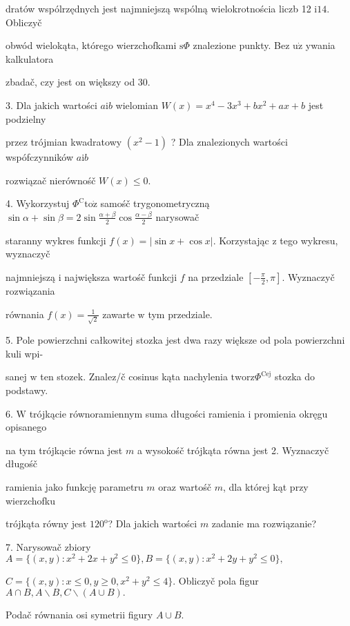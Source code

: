 \documentclass[a4paper,12pt]{article}
\begin{document}
dratów wspólrzędnych jest najmniejszą wspólną wielokrotnościa liczb 12 $\mathrm{i} 14$. Obliczyč

obwód wielokąta, którego wierzchofkami $\mathrm{s}\Phi$ znalezione punkty. Bez $\mathrm{u}\dot{\mathrm{z}}$ ywania kalkulatora

zbadač, czy jest on większy od 30.

3. Dla jakich wartości $a \mathrm{i} b$ wielomian $W(x) = x^{4}-3x^{3}+bx^{2}+ax+b$ jest podzielny

przez trójmian kwadratowy $(x^{2}-1)$ ? Dla znalezionych wartości wspófczynników $a\mathrm{i}b$

rozwiązač nierównośč $W(x)\leq 0.$

4. Wykorzystuj $\Phi^{\mathrm{C}}\mathrm{t}\mathrm{o}\dot{\mathrm{z}}$ samośč trygonometryczną $\displaystyle \sin\alpha+\sin\beta=2\sin\frac{\alpha+\beta}{2}\cos\frac{\alpha-\beta}{2}$ narysowač

staranny wykres funkcji $f(x)=|\sin x+\cos x|$. Korzystając $\mathrm{z}$ tego wykresu, wyznaczyč

najmniejszą $\mathrm{i}$ największa wartośč funkcji $f$ na przedziale $[-\displaystyle \frac{\pi}{2},\pi]$. Wyznaczyč rozwiązania

równania $f(x)=\displaystyle \frac{1}{\sqrt{2}}$ zawarte $\mathrm{w}$ tym przedziale.

5. Pole powierzchni całkowitej stozka jest dwa razy większe od pola powierzchni kuli wpi-

sanej $\mathrm{w}$ ten stozek. Znalez/č cosinus kąta nachylenia $\mathrm{t}\mathrm{w}\mathrm{o}\mathrm{r}\mathrm{z}\Phi^{\mathrm{C}\mathrm{e}\mathrm{j}}$ stozka do podstawy.

6. $\mathrm{W}$ trójkącie równoramiennym suma długości ramienia $\mathrm{i}$ promienia okręgu opisanego

na tym trójkącie równa jest $m$ a wysokośč trójkąta równa jest 2. Wyznaczyč długośč

ramienia jako funkcję parametru $m$ oraz wartośč $m$, dla której kąt przy wierzchofku

trójkąta równy jest $120^{\mathrm{o}}$? Dla jakich wartości $m$ zadanie ma rozwiązanie?

7. Narysowač zbiory $A=\{(x,y):x^{2}+2x+y^{2}\leq 0\}, B= \{(x,y):x^{2}+2y+y^{2}\leq 0\},$

$C=\{(x,y):x\leq 0,y\geq 0,x^{2}+y^{2}\leq 4\}$. Obliczyč pola figur $A\cap B, A\backslash B, C\backslash (A\cup B).$

Podač równania osi symetrii figury $A\cup B.$
\end{document}
